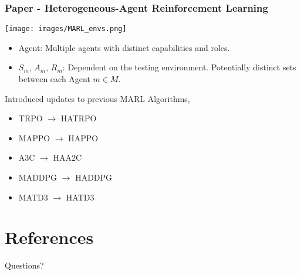 \documentclass{beamer}
\begin{document}
\begin{frame}
    \frametitle{Paper \thepapercounter - Heterogeneous-Agent Reinforcement Learning%
    }
    \begin{description} \small
        \item[Environments:]
    \end{description}
        \texttt{[image: images/MARL\_envs.png]}
    \begin{description}\small
        \item[Model:]
        \begin{itemize} \small
            \item Agent: Multiple agents with distinct capabilities and roles.
            \item $S_m$, $A_m$, $R_m$: Dependent on the testing environment.
            Potentially distinct sets between each Agent $m\in M$.
        \end{itemize}
        \item[Algorithms:] Introduced updates to previous MARL Algorithms, \vspace*{-1em}
        \begin{multicols*}{2}
            \begin{itemize} \small
                \item TRPO\cite{schulman2017} $\rightarrow$ HATRPO
                \item MAPPO\cite{yu2022} $\rightarrow$ HAPPO
                \item A3C\cite{mnih2016} $\rightarrow$ HAA2C
                \item MADDPG\cite{lowe2020} $\rightarrow$ HADDPG
                \item MATD3\cite{ackermann2019} $\rightarrow$ HATD3
            \end{itemize}
        \end{multicols*}
    \end{description}
\end{frame}

\section{References}

\renewcommand*{\bibfont}{\tiny}
\frame[allowframebreaks]{\printbibliography}

\begin{frame}
    Questions?
\end{frame}
\end{document}
